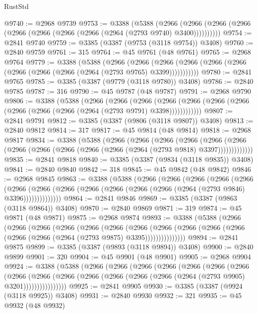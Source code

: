 \begin{lexlean}{RustStd}
\begin{coremodule}
@9740 := @2968 @9739
@9753 := @3388
    (@5388
      (@2966 (@2966 (@2966 (@2966 (@2966 (@2966 (@2966 (@2966 (@2964 (@2793 @9740) @3400))))))))))
@9754 := @2841 @9740
@9759 := @3385 (@3387 (@9753 (@3118 @9754)) @3408)
@9760 := @2840 @9759
@9761 := 315
@9764 := @45 @9761 (@48 @9761)
@9765 := @2968 @9764
@9779 := @3388
    (@5388
      (@2966
        (@2966
          (@2966 (@2966 (@2966 (@2966 (@2966 (@2966 (@2966 (@2964 (@2793 @9765) @3399)))))))))))
@9780 := @2841 @9765
@9785 := @3385 (@3387 (@9779 (@3118 @9780)) @3408)
@9786 := @2840 @9785
@9787 := 316
@9790 := @45 @9787 (@48 @9787)
@9791 := @2968 @9790
@9806 := @3388
    (@5388
      (@2966
        (@2966
          (@2966
            (@2966 (@2966 (@2966 (@2966 (@2966 (@2966 (@2966 (@2964 (@2793 @9791) @3398))))))))))))
@9807 := @2841 @9791
@9812 := @3385 (@3387 (@9806 (@3118 @9807)) @3408)
@9813 := @2840 @9812
@9814 := 317
@9817 := @45 @9814 (@48 @9814)
@9818 := @2968 @9817
@9834 := @3388
    (@5388
      (@2966
        (@2966
          (@2966
            (@2966
              (@2966
                (@2966 (@2966 (@2966 (@2966 (@2966 (@2966 (@2964 (@2793 @9818) @3397)))))))))))))
@9835 := @2841 @9818
@9840 := @3385 (@3387 (@9834 (@3118 @9835)) @3408)
@9841 := @2840 @9840
@9842 := 318
@9845 := @45 @9842 (@48 @9842)
@9846 := @2968 @9845
@9863 := @3388
    (@5388
      (@2966
        (@2966
          (@2966
            (@2966
              (@2966
                (@2966
                  (@2966 (@2966 (@2966 (@2966 (@2966 (@2966 (@2964 (@2793 @9846) @3396))))))))))))))
@9864 := @2841 @9846
@9869 := @3385 (@3387 (@9863 (@3118 @9864)) @3408)
@9870 := @2840 @9869
@9871 := 319
@9874 := @45 @9871 (@48 @9871)
@9875 := @2968 @9874
@9893 := @3388
    (@5388
      (@2966
        (@2966
          (@2966
            (@2966
              (@2966
                (@2966
                  (@2966
                    (@2966
                      (@2966 (@2966 (@2966 (@2966 (@2966 (@2964 (@2793 @9875) @3395)))))))))))))))
@9894 := @2841 @9875
@9899 := @3385 (@3387 (@9893 (@3118 @9894)) @3408)
@9900 := @2840 @9899
@9901 := 320
@9904 := @45 @9901 (@48 @9901)
@9905 := @2968 @9904
@9924 := @3388
    (@5388
      (@2966
        (@2966
          (@2966
            (@2966
              (@2966
                (@2966
                  (@2966
                    (@2966
                      (@2966
                        (@2966
                          (@2966 (@2966 (@2966 (@2966 (@2964 (@2793 @9905) @3201))))))))))))))))
@9925 := @2841 @9905
@9930 := @3385 (@3387 (@9924 (@3118 @9925)) @3408)
@9931 := @2840 @9930
@9932 := 321
@9935 := @45 @9932 (@48 @9932)

\end{coremodule}
\end{lexlean}
